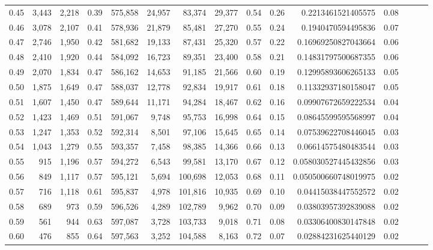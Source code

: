 \begin{tabular}{rrrrrrrrrrrrrrr}
0.45 &   3,443 &  2,218 &  0.39 &  575,858 &   24,957 &   83,374 &   29,377 &  0.54 &  0.26 &      0.2213461521405575 &      0.08 \\
0.46 &   3,078 &  2,107 &  0.41 &  578,936 &   21,879 &   85,481 &   27,270 &  0.55 &  0.24 &      0.1940470594495836 &      0.07 \\
0.47 &   2,746 &  1,950 &  0.42 &  581,682 &   19,133 &   87,431 &   25,320 &  0.57 &  0.22 &     0.16969250827043664 &      0.06 \\
0.48 &   2,410 &  1,920 &  0.44 &  584,092 &   16,723 &   89,351 &   23,400 &  0.58 &  0.21 &     0.14831797500687355 &      0.06 \\
0.49 &   2,070 &  1,834 &  0.47 &  586,162 &   14,653 &   91,185 &   21,566 &  0.60 &  0.19 &     0.12995893606265133 &      0.05 \\
0.50 &   1,875 &  1,649 &  0.47 &  588,037 &   12,778 &   92,834 &   19,917 &  0.61 &  0.18 &     0.11332937180158047 &      0.05 \\
0.51 &   1,607 &  1,450 &  0.47 &  589,644 &   11,171 &   94,284 &   18,467 &  0.62 &  0.16 &     0.09907672659222534 &      0.04 \\
0.52 &   1,423 &  1,469 &  0.51 &  591,067 &    9,748 &   95,753 &   16,998 &  0.64 &  0.15 &     0.08645599595568997 &      0.04 \\
0.53 &   1,247 &  1,353 &  0.52 &  592,314 &    8,501 &   97,106 &   15,645 &  0.65 &  0.14 &     0.07539622708446045 &      0.03 \\
0.54 &   1,043 &  1,279 &  0.55 &  593,357 &    7,458 &   98,385 &   14,366 &  0.66 &  0.13 &     0.06614575480483544 &      0.03 \\
0.55 &     915 &  1,196 &  0.57 &  594,272 &    6,543 &   99,581 &   13,170 &  0.67 &  0.12 &    0.058030527445432856 &      0.03 \\
0.56 &     849 &  1,117 &  0.57 &  595,121 &    5,694 &  100,698 &   12,053 &  0.68 &  0.11 &    0.050500660748019975 &      0.02 \\
0.57 &     716 &  1,118 &  0.61 &  595,837 &    4,978 &  101,816 &   10,935 &  0.69 &  0.10 &     0.04415038447552572 &      0.02 \\
0.58 &     689 &    973 &  0.59 &  596,526 &    4,289 &  102,789 &    9,962 &  0.70 &  0.09 &     0.03803957392839088 &      0.02 \\
0.59 &     561 &    944 &  0.63 &  597,087 &    3,728 &  103,733 &    9,018 &  0.71 &  0.08 &     0.03306400830147848 &      0.02 \\
0.60 &     476 &    855 &  0.64 &  597,563 &    3,252 &  104,588 &    8,163 &  0.72 &  0.07 &     0.02884231625440129 &      0.02 \\

\end{tabular}
